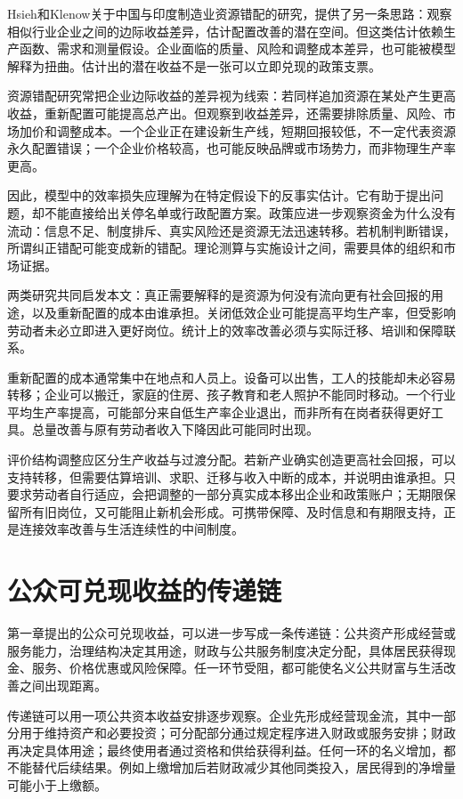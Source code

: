\documentclass[UTF8,fontset=fandol,zihao=-4,oneside,openany]{ctexbook}
\begin{document}
Hsieh和Klenow关于中国与印度制造业资源错配的研究，提供了另一条思路：观察相似行业企业之间的边际收益差异，估计配置改善的潜在空间。但这类估计依赖生产函数、需求和测量假设。企业面临的质量、风险和调整成本差异，也可能被模型解释为扭曲。估计出的潜在收益不是一张可以立即兑现的政策支票。\cite{Hsieh2009}

\label{arg:P084}
资源错配研究常把企业边际收益的差异视为线索：若同样追加资源在某处产生更高收益，重新配置可能提高总产出。但观察到收益差异，还需要排除质量、风险、市场加价和调整成本。一个企业正在建设新生产线，短期回报较低，不一定代表资源永久配置错误；一个企业价格较高，也可能反映品牌或市场势力，而非物理生产率更高。

因此，模型中的效率损失应理解为在特定假设下的反事实估计。它有助于提出问题，却不能直接给出关停名单或行政配置方案。政策应进一步观察资金为什么没有流动：信息不足、制度排斥、真实风险还是资源无法迅速转移。若机制判断错误，所谓纠正错配可能变成新的错配。理论测算与实施设计之间，需要具体的组织和市场证据。

两类研究共同启发本文：真正需要解释的是资源为何没有流向更有社会回报的用途，以及重新配置的成本由谁承担。关闭低效企业可能提高平均生产率，但受影响劳动者未必立即进入更好岗位。统计上的效率改善必须与实际迁移、培训和保障联系。

\label{arg:P085}
重新配置的成本通常集中在地点和人员上。设备可以出售，工人的技能却未必容易转移；企业可以搬迁，家庭的住房、孩子教育和老人照护不能同时移动。一个行业平均生产率提高，可能部分来自低生产率企业退出，而非所有在岗者获得更好工具。总量改善与原有劳动者收入下降因此可能同时出现。

评价结构调整应区分生产收益与过渡分配。若新产业确实创造更高社会回报，可以支持转移，但需要估算培训、求职、迁移与收入中断的成本，并说明由谁承担。只要求劳动者自行适应，会把调整的一部分真实成本移出企业和政策账户；无期限保留所有旧岗位，又可能阻止新机会形成。可携带保障、及时信息和有期限支持，正是连接效率改善与生活连续性的中间制度。

\section{公众可兑现收益的传递链}
第一章提出的公众可兑现收益，可以进一步写成一条传递链：公共资产形成经营或服务能力，治理结构决定其用途，财政与公共服务制度决定分配，具体居民获得现金、服务、价格优惠或风险保障。任一环节受阻，都可能使名义公共财富与生活改善之间出现距离。

\label{arg:P086}
传递链可以用一项公共资本收益安排逐步观察。企业先形成经营现金流，其中一部分用于维持资产和必要投资；可分配部分通过规定程序进入财政或服务安排；财政再决定具体用途；最终使用者通过资格和供给获得利益。任何一环的名义增加，都不能替代后续结果。例如上缴增加后若财政减少其他同类投入，居民得到的净增量可能小于上缴额。
\end{document}
